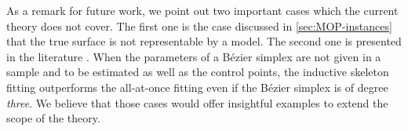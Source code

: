 \documentclass{article}
\begin{document}
As a remark for future work, we point out two important cases which the current theory does not cover.
The first one is the case discussed in \cref{sec:MOP-instances} that the true surface is not representable by a model.
The second one is presented in the literature \cite{Kobayashi2019}.
When the parameters of a B\'ezier simplex are not given in a sample and to be estimated as well as the control points, the inductive skeleton fitting outperforms the all-at-once fitting even if the B\'ezier simplex is of degree \emph{three}.
We believe that those cases would offer insightful examples to extend the scope of the theory.



\end{document}
